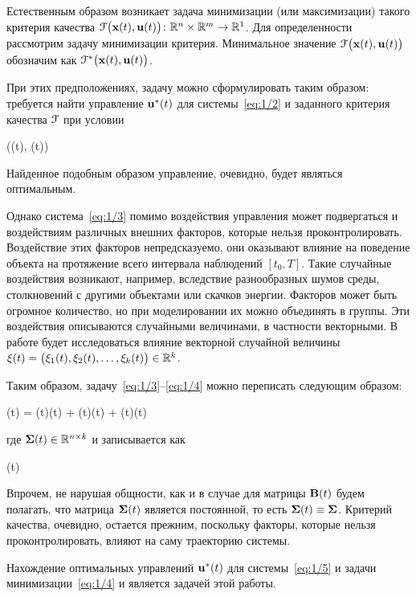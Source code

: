 Естественным образом возникает задача минимизации (или максимизации) такого критерия качества $\mathcal{F}\bigl(\mathbf{x}(t), \mathbf{u}(t)\bigr) \colon \mathbb{R}^{n} \times \mathbb{R}^{m} \to \mathbb{R}^{1}$. Для определенности рассмотрим задачу минимизации критерия. Минимальное значение $\mathcal{F}\bigl(\mathbf{x}(t), \mathbf{u}(t)\bigr)$ обозначим как $\mathcal{F}^{*}\bigl(\mathbf{x}(t), \mathbf{u}(t)\bigr)$.

При этих предположениях, задачу можно сформулировать таким образом: требуется найти управление $\mathbf{u}^{*}(t)$ для системы~\ref{eq:1/2} и заданного критерия качества $\mathcal{F}$ при условии

    \funcF\bigl((t), (t)\bigr) \to \min {}
\eeq

Найденное подобным образом управление, очевидно, будет являться оптимальным.

\br

Однако система~\ref{eq:1/3} помимо воздействия управления может подвергаться и воздействиям различных внешних факторов, которые нельзя проконтролировать. Воздействие этих факторов непредсказуемо, они оказывают влияние на поведение объекта на протяжение всего интервала наблюдений $[t_0, T]$. Такие случайные воздействия возникают, например, вследствие разнообразных шумов среды, столкновений с другими объектами или скачков энергии. Факторов может быть огромное количество, но при моделировании их можно объединять в группы. Эти воздействия описываются случайными величинами, в частности векторными. В работе будет исследоваться влияние векторной случайной величины $\mathbf{\xi}(t) = \bigl( \xi_1(t), \xi_2(t), \ldots, \xi_k(t) \bigr) \in \mathbb{R}^{k}$.

Таким образом, задачу~\ref{eq:1/3}--\ref{eq:1/4} можно переписать следующим образом:

    (t) = (t)(t) + (t)(t) + \m{\Sigma}(t)\m{\xi}(t) \text{,}
\eeq

где $\mathbf{\Sigma}(t) \in \mathbb{R}^{{n} \times {k}}$ и записывается как

\beqn
    \m{\Sigma}(t) \eqdef {} 
\eeqn

Впрочем, не нарушая общности, как и в случае для матрицы $\mathbf{B}(t)$ будем полагать, что матрица $\mathbf{\Sigma}(t)$ является постоянной, то есть $\mathbf{\Sigma}(t) \equiv \mathbf{\Sigma}$. Критерий качества, очевидно, остается прежним, поскольку факторы, которые нельзя проконтролировать, влияют на саму траекторию системы.

Нахождение оптимальных управлений $\mathbf{u}^{*}(t)$ для системы~\ref{eq:1/5} и задачи минимизации~\ref{eq:1/4} и является задачей этой работы.
